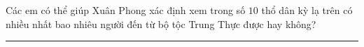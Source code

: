 \begin{multicols}{2}
	Các em có thể giúp Xuân Phong xác định xem trong số $10$ thổ dân kỳ lạ trên có nhiều nhất bao nhiêu người đến từ bộ tộc Trung Thực được hay không?
%	
%	
%	
%	
\end{multicols}
\vspace*{-10pt}
{\color{toancuabi}\rule{1\linewidth}{0.1pt}}
\begingroup
{} 
\centering
\endgroup
\vspace*{48pt}

